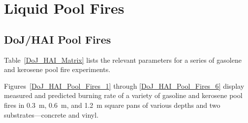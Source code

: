 \clearpage

\section{Liquid Pool Fires}
\label{sec:Liquid_Pool_Fires_MLR}

\subsection{DoJ/HAI Pool Fires}

Table~\ref{DoJ_HAI_Matrix} lists the relevant parameters for a series of gasolene and kerosene pool fire experiments.

Figures~\ref{DoJ_HAI_Pool_Fires_1} through \ref{DoJ_HAI_Pool_Fires_6} display measured and predicted burning rate of a variety of gasoline and kerosene pool fires in 0.3~m, 0.6~m, and 1.2~m square pans of various depths and two substrates---concrete and vinyl.

